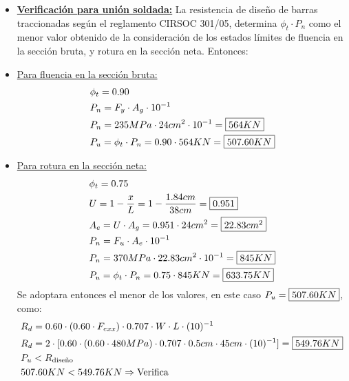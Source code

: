 \begin{enumerate}
\begin{itemize}
\item \underline{\textbf{Verificación para unión soldada:}}
La resistencia de diseño de barras traccionadas según el reglamento CIRSOC 301/05, determina $\phi_t \cdot P_n$ como el menor valor obtenido de la consideración de los estados límites de fluencia en la sección bruta, y rotura en la sección neta. Entonces:\\
\item \underline{Para fluencia en la sección bruta:}
\begin{align*}
& \phi_t = 0.90 \\
& P_n = F_y \cdot A_g \cdot 10^{-1} \\
& P_n = 235MPa \cdot 24cm^2 \cdot 10^{-1} = \framebox{$564KN$}\\
& P_u = \phi_t \cdot P_n = 0.90 \cdot 564KN = \framebox{$507.60KN$}
\end{align*}

\item \underline{Para rotura en la sección neta:}
\begin{align*}
& \phi_t = 0.75 \\
& U = 1 - \frac{x}{L} = 1 - \frac{1.84cm}{38cm} = \framebox{$0.951$} \\
& A_e = U \cdot A_g = 0.951 \cdot 24cm^2 = \framebox{$22.83cm^2$} \\
& P_n = F_u \cdot A_e \cdot 10^{-1} \\
& P_n = 370MPa \cdot 22.83cm^2 \cdot 10^{-1} = \framebox{$845KN$}\\
& P_u = \phi_t \cdot P_n = 0.75 \cdot 845KN = \framebox{$633.75KN$}
\end{align*}
Se adoptara entonces el menor de los valores, en este caso $P_u = \framebox{$507.60KN$}$, como:
\begin{align*}
& R_d = 0.60 \cdot (0.60 \cdot F_{exx}) \cdot 0.707 \cdot W \cdot L \cdot (10)^{-1} \\
& R_d = 2 \cdot [0.60 \cdot (0.60 \cdot 480MPa) \cdot 0.707 \cdot 0.5cm \cdot 45cm \cdot (10)^{-1}] = \framebox{$549.76KN$}\\
& P_u < R_{\text{diseño}} \\
& 507.60KN < 549.76KN \Rightarrow \text{Verifica}
\end{align*}

\end{itemize}
\end{enumerate}
